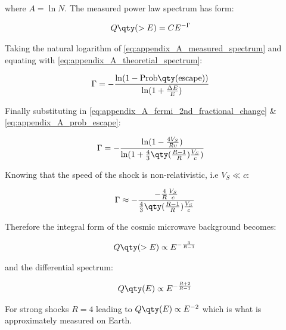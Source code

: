 where $A=\ln N$. The measured power law spectrum has form:

\begin{equation}
    \begin{aligned}
    	Q\qty(>E)&=CE^{-\Gamma}
    \end{aligned}\label{eq:appendix_A_measured_spectrum}
\end{equation}

Taking the natural logarithm of \autoref{eq:appendix_A_measured_spectrum} and equating with \autoref{eq:appendix_A_theoretial_spectrum}:

\begin{equation}
    \begin{aligned}
    \Gamma &= -\frac{\ln(1-\text{Prob}\qty(\text{escape}))}{\ln(1+\frac{\Delta E}{E})}
    \end{aligned}
\end{equation}

Finally substituting in \autoref{eq:appendix_A_fermi_2nd_fractional_change} \& \autoref{eq:appendix_A_prob_escape}:

\begin{equation}
    \begin{aligned}
    \Gamma &=-\frac{\ln(1-\frac{4V_S}{Rv})}{\ln(1+\frac{4}{3}\qty(\frac{R-1}{R})\frac{V_S}{c})}
    \end{aligned}
\end{equation}

Knowing that the speed of the shock is non-relativistic, i.e $V_S\ll c$:

\begin{equation}
    \begin{aligned}
    \Gamma &\approx -\frac{-\frac{4}{R}\frac{V_S}{c}}{\frac{4}{3}\qty(\frac{R-1}{R})\frac{V_S}{c}} \\
    \end{aligned}
\end{equation}

Therefore the integral form of the cosmic microwave background becomes:

\begin{equation}
    \begin{aligned}
    Q\qty(>E)\propto E^{-\frac{3}{R-1}}
    \end{aligned}
\end{equation}

and the differential spectrum:

\begin{equation}
    \begin{aligned}
    Q\qty(E)\propto E^{-\frac{R+2}{R-1}}
    \end{aligned}
\end{equation}

For strong shocks $R=4$ leading to $Q\qty(E)\propto E^{-2}$ which is what is approximately measured on Earth.
